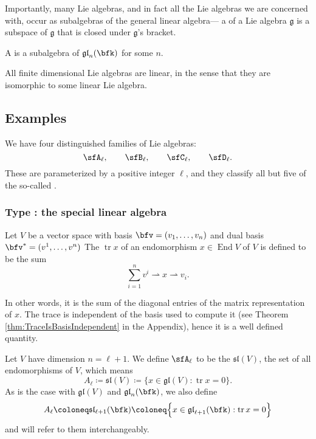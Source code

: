 \documentclass{article}
\DeclareMathOperator{\End}{End}
\DeclareMathOperator{\tr}{tr}
\newcommand*\frkg{{\ensuremath{\mathfrak{g}}}}
\newcommand*\glalg{\ensuremath{\mathfrak{gl}}}
\newcommand*\slalg{\ensuremath{\mathfrak{sl}}}
\begin{document}
Importantly, many Lie algebras, and in fact all the Lie algebras we are concerned with, occur as subalgebras of the general linear algebra--- a  of a Lie algebra $\frkg$ is a subspace of $\frkg$ that is closed under $\frkg$'s bracket.

\begin{definition}
    A  is a subalgebra of $\glalg_n(\bfk)$ for some $n$.
\end{definition}

All finite dimensional Lie algebras are linear, in the sense that they are isomorphic to some linear Lie algebra.

\subsection{Examples}

We have four distinguished families of Lie algebras:
\[
    \sfA_\ell,\qquad
    \sfB_\ell,\qquad
    \sfC_\ell,\qquad
    \sfD_\ell.
\]
These are parameterized by a positive integer $\ell$, and they classify all but five of the so-called .

\subsubsection{Type \sfA: the special linear algebra}

\begin{definition}
    Let $V$ be a vector space with basis $\bfv = (v_1, \ldots, v_n)$ and dual basis $\bfv^\ast = (v^1, \ldots, v^n)$
    The  $\tr x$ of an endomorphism $x \in \End V$ of $V$ is defined to be the sum
    \[
        \sum_{i=1}^n 
        v^i \rightharpoonup x \rightharpoonup v_i.
    \]
\end{definition}

In other words, it is the sum of the diagonal entries of the matrix representation of $x$.
The trace is independent of the basis used to compute it (see Theorem \ref{thm:TraceIsBasisIndependent} in the Appendix), hence it is a well defined quantity.

\begin{definition}
    Let $V$ have dimension $n = \ell + 1$.
    We define $\sfA_\ell$ to be the  $\slalg(V)$, the set of all  endomorphisms of $V$, which means
    \[
        A_\ell
        \coloneq
        \slalg(V)
        \coloneq
        \Big\{
            x \in \glalg(V) : \tr x = 0
        \Big\}.
    \]
    As is the case with $\glalg(V)$ and $\glalg_n(\bfk)$, we also define 
    \[
        A_\ell
        \coloneq
        \slalg_{\ell+1}(\bfk)
        \coloneq
        \Big\{
            x \in \glalg_{\ell+1}(\bfk) : \tr x = 0
        \Big\}
    \]
    and will refer to them interchangeably.
\end{definition}
\end{document}
